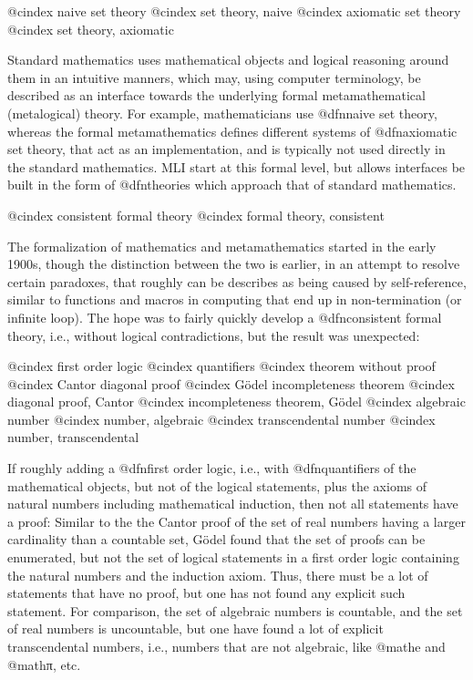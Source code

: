 @cindex naive set theory
@cindex set theory, naive
@cindex axiomatic set theory
@cindex set theory, axiomatic

Standard mathematics uses mathematical objects and logical reasoning around them in an intuitive manners, which may, using computer terminology, be described as an interface towards the underlying formal metamathematical (metalogical) theory. For example, mathematicians use @dfn{naive set theory}, whereas the formal metamathematics defines different systems of @dfn{axiomatic set theory}, that act as an implementation, and is typically not used directly in the standard mathematics. MLI start at this formal level, but allows interfaces be built in the form of @dfn{theories} which approach that of standard mathematics.


@cindex consistent formal theory
@cindex formal theory, consistent

The formalization of mathematics and metamathematics started in the early 1900s, though the distinction between the two is earlier, in an attempt to resolve certain paradoxes, that roughly can be describes as being caused by self-reference, similar to functions and macros in computing that end up in non-termination (or infinite loop). The hope was to fairly quickly develop a @dfn{consistent} formal theory, i.e., without logical contradictions, but the result was unexpected:


@cindex first order logic
@cindex quantifiers
@cindex theorem without proof
@cindex Cantor diagonal proof
@cindex Gödel incompleteness theorem
@cindex diagonal proof, Cantor
@cindex incompleteness theorem, Gödel
@cindex algebraic number
@cindex number, algebraic
@cindex transcendental number
@cindex number, transcendental

If roughly adding a @dfn{first order logic}, i.e., with @dfn{quantifiers} of the mathematical objects, but not of the logical statements, plus the axioms of natural numbers including mathematical induction, then not all statements have a proof: Similar to the the Cantor proof of the set of real numbers having a larger cardinality than a countable set, Gödel found that the set of proofs can be enumerated, but not the set of logical statements in a first order logic containing the natural numbers and the induction axiom. Thus, there must be a lot of statements that have no proof, but one has not found any explicit such statement. For comparison, the set of algebraic numbers is countable, and the set of real numbers is uncountable, but one have found a lot of explicit transcendental numbers, i.e., numbers that are not algebraic, like @math{e} and @math{π}, etc.

